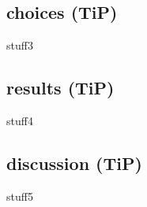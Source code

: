 \subsection{choices (TiP)}\label{sec:hw:tip1}
stuff3

\subsection{results (TiP)}\label{sec:hw:tip2}
stuff4

\subsection{discussion (TiP)}\label{sec:hw:tip3}
stuff5